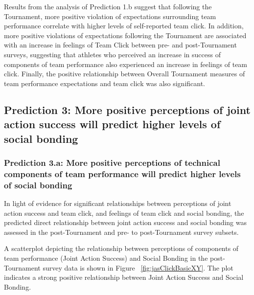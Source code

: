 \begin{landscape}

   

   


   Results from the analysis of Prediction 1.b suggest that following the Tournament, more positive violation of expectations surrounding team performance correlate with higher levels of self-reported team click.  In addition, more positive violations of expectations following the Tournament are associated with an increase in feelings of Team Click between pre- and post-Tournament surveys, suggesting that athletes who perceived an increase in success of components of team performance also experienced an increase in feelings of team click.  Finally, the positive relationship between Overall Tournament measures of team performance expectations and team click was also significant.






\subsection{Prediction 3: More positive perceptions of joint action success will predict higher levels of social bonding}



\subsubsection{Prediction 3.a: More positive perceptions of technical components of team performance will predict higher levels of social bonding }
In light of evidence for significant relationships between perceptions of joint action success and team click, and feelings of team click and social bonding, the predicted direct relationship between joint action success and social bonding was assessed in the post-Tournament and pre- to post-Tournament survey subsets.

A scatterplot depicting the relationship between perceptions of components of team performance (Joint Action Success) and Social Bonding in the post-Tournament survey data is shown in Figure ~\ref{fig:jasClickBasicXY}. The plot indicates a strong positive relationship between Joint Action Success and Social Bonding.


\end{landscape}
